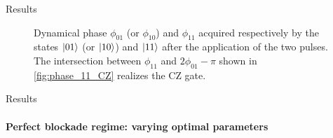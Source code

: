 \documentclass[8pt]{beamer}
\begin{document}
\begin{frame}{Results}
\begin{figure}[H]
\begin{minipage}[]{0.49\linewidth}
        \end{minipage}
        \caption{Dynamical phase $\phi_{01}$ (or $\phi_{10}$) and $\phi_{11}$ acquired respectively by the states $\ket{01}$ (or $\ket{10}$) and $\ket{11}$ after the application of the two pulses. The intersection between $\phi_{11}$ and $2\phi_{01}-\pi$ shown in \ref{fig:phase_11_CZ} realizes the CZ gate. }
        \label{fig:phase_perfect-blockade}
        \end{figure}
    \end{frame}
    
 	\begin{frame}{Results}
	\framesubtitle{Perfect blockade regime: varying optimal parameters}  
        \begin{figure}[H]
        \begin{minipage}[c]{0.49\linewidth}
        \end{minipage}
        \begin{minipage}[]{0.49\linewidth}
        \centering

\end{minipage}
\end{figure}
\end{frame}
\end{document}
